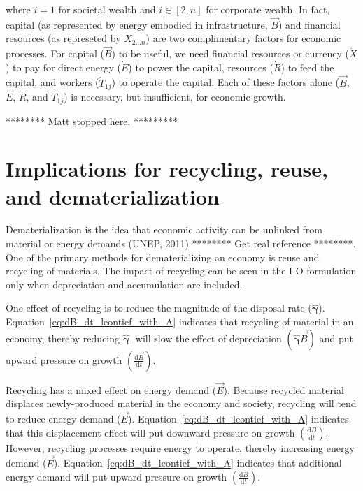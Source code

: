 \noindent{}where $i=1$ for societal wealth 
and $i \in [2,n]$ for corporate wealth.
In fact, capital (as represented by energy embodied in infrastructure, $\vec{B}$) and 
financial resources (as represeted by $X_{2 \ldots n}$) 
are two complimentary factors for economic processes. 
For capital ($\vec{B}$) to be useful, we need financial resources
or currency ($\dot{X}$) to pay for 
direct energy ($\dot{E}$) to power the capital,
resources ($\dot{R}$) to feed the capital, and
workers ($\dot{T}_{1j}$) to operate the capital.
Each of these factors alone ($\vec{B}$, $\dot{E}$, $\dot{R}$, and $\dot{T}_{1j}$)
is necessary, but insufficient, for economic growth.

******** Matt stopped here. *********


\section{Implications for recycling, reuse, and dematerialization}

Dematerialization is the idea that economic activity can be unlinked 
from material or energy demands (UNEP, 2011) 
******** Get real reference ********. 
One of the primary methods for dematerializing an economy 
is reuse and recycling of materials. 
The impact of recycling can be seen in the I-O formulation 
only when depreciation and accumulation are included. 

One effect of recycling is to reduce the magnitude 
of the disposal rate 
($\hat{\bm{\gamma}}$). 
Equation~\ref{eq:dB_dt_leontief_with_A} indicates that 
recycling of material in an economy, 
thereby reducing $\hat{\bm{\gamma}}$, 
will slow the effect of depreciation 
$\left(\hat{\bm{\gamma}}\vec{B}\right)$ 
and put upward pressure on growth 
$\left(\frac{\mathrm{d}\vec{B}}{\mathrm{d}t}\right)$. 

Recycling has a mixed effect on energy demand ($\vec{E}$). 
Because recycled material displaces newly-produced material 
in the economy and society, 
recycling will tend to reduce energy demand ($\vec{E}$). 
Equation~\ref{eq:dB_dt_leontief_with_A} indicates that 
this displacement effect will put downward pressure on growth 
$\left(\frac{\mathrm{d}B}{\mathrm{d}t}\right)$. 
However, recycling processes require energy to operate, 
thereby increasing energy demand ($\vec{E}$). 
Equation~\ref{eq:dB_dt_leontief_with_A} indicates that 
additional energy demand will put upward pressure on growth 
$\left(\frac{\mathrm{d}B}{\mathrm{d}t}\right)$. 

